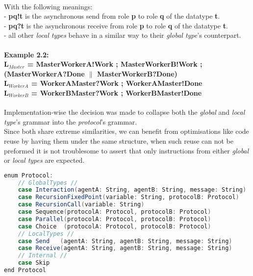 \\
With the following meanings:\\
- \textbf{pq!t} is the asynchronous send from role \textbf{p} to role \textbf{q} of the datatype \textbf{t}.\\
- \textbf{pq?t} is the asynchronous receive from role \textbf{p} to role \textbf{q} of the datatype \textbf{t}.\\
- all other \textit{local types} behave in a similar way to their \textit{global type}'s counterpart.\\
\\
\textbf{Example 2.2:}\\
\scriptsize
\textbf{L$_{Master}$ = MasterWorkerA!Work ; MasterWorkerB!Work ; (MasterWorkerA?Done $\|$ MasterWorkerB?Done)}\\
\textbf{L$_{WorkerA}$ = WorkerAMaster?Work ; WorkerAMaster!Done}\\
\textbf{L$_{WorkerB}$ = WorkerBMaster?Work ; WorkerBMaster!Done}\\
\\
\normalsize
Implementation-wise the decision was made to collapse both the \textit{global} and \textit{local type}'s grammar into the \textit{protocol}'s grammar.\\
Since both share extreme similarities, we can benefit from optimisations like code reuse by having them under the same structure, when such reuse can not be preformed it is not troublesome to assert that only instructions from either \textit{global} or \textit{local types} are expected.
\begin{lstlisting}[language=Scala, caption=grammar]
enum Protocol:
    // GlobalTypes //
    case Interaction(agentA: String, agentB: String, message: String)
    case RecursionFixedPoint(variable: String, protocolB: Protocol)
    case RecursionCall(variable: String)
    case Sequence(protocolA: Protocol, protocolB: Protocol)
    case Parallel(protocolA: Protocol, protocolB: Protocol)
    case Choice  (protocolA: Protocol, protocolB: Protocol)
    // LocalTypes //
    case Send   (agentA: String, agentB: String, message: String)
    case Receive(agentA: String, agentB: String, message: String)
    // Internal //
    case Skip
end Protocol
\end{lstlisting}